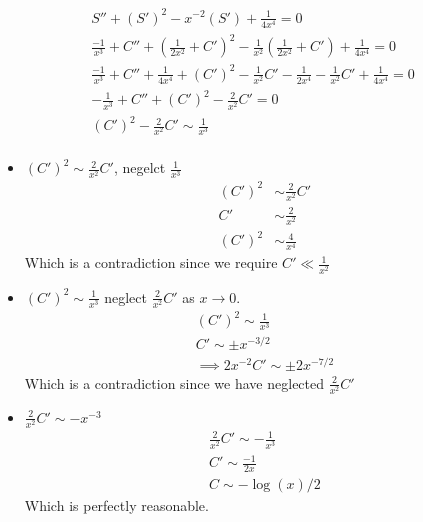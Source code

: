 \documentclass{/home/janmebows/Documents/LatexTemplates/myassignment}
\begin{document}
\begin{enumerate}
\begin{enumerate}
        \begin{align*}
             S'' + (S')^2 - x^{-2} (S') + \frac1{4x^4} = 0\\
            \frac{-1}{x^3} + C'' + (\frac{1}{2x^2} + C')^2 - \frac{1}{x^2} (\frac{1}{2x^2} + C') + \frac1{4x^4} =0\\
            \frac{-1}{x^3} + C'' + \frac{1}{4x^4} + (C')^2 -\frac{1}{x^2}C' - \frac{1}{2x^{4}} -\frac{1}{x^2}C' + \frac1{4x^4} =0\\
            -\frac{1}{x^3} + C'' + (C')^2 - \frac{2}{x^2} C' =0\\
            (C')^2 - \frac{2}{x^2} C' \sim \frac{1}{x^3} \\
        \end{align*}
        \begin{itemize}
            \item $(C')^2 \sim \frac{2}{x^2} C'$, negelct $\frac1{x^3}$
            \begin{align*}
            (C')^2 &\sim \frac{2}{x^2} C'\\
                C' &\sim \frac2{x^2}\\
                (C')^2 &\sim \frac{4}{x^4}
            \end{align*}
            Which is a contradiction since we require  $C' \ll \frac{1}{x^2}$

            \item $(C')^2 \sim  \frac{1}{x^3} $ neglect $\frac2{x^2} C'$ as $x\to 0$.
            \begin{align*}
                (C')^2 \sim  \frac{1}{x^3} \\
                C' \sim \pm x^{-3/2}\\
                \implies 2 x^{-2} C' \sim \pm 2x^{-7/2}
            \end{align*}
            Which is a contradiction since we have neglected $\frac2{x^2} C'$
            
            \item $\frac2{x^2}C' \sim -x^{-3}$
            \begin{align*}
                \frac2{x^2}C' \sim -\frac{1}{x^{3}}\\
                C' \sim \frac{-1}{2x}\\
                C \sim -\log(x)/2
            \end{align*}
            Which is perfectly reasonable. 
        \end{itemize}
        \noindent\hrulefill


\end{enumerate}
\end{enumerate}
\end{document}
